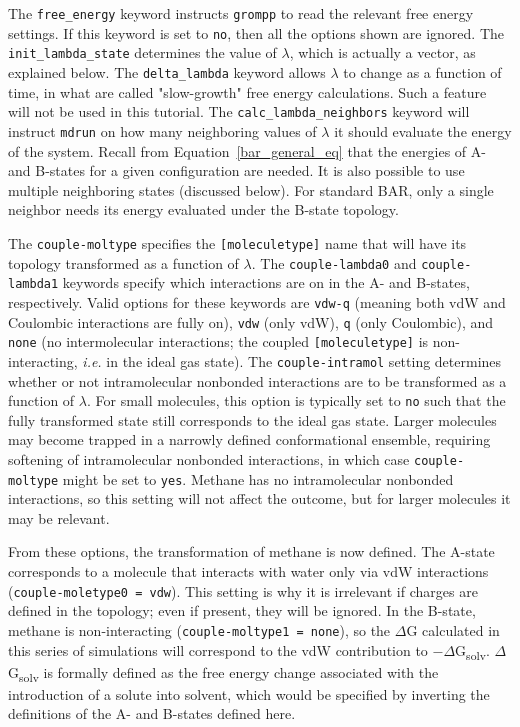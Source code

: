 \documentclass[9pt,tutorial]{livecoms}
\begin{document}
The \texttt{free\_energy} keyword instructs \texttt{grompp} to read the relevant free energy settings. If this keyword is set to \texttt{no}, then all the options shown are ignored. The \texttt{init\_lambda\_state} determines the value of $\lambda$, which is actually a vector, as explained below. The \texttt{delta\_lambda} keyword allows $\lambda$ to change as a function of time, in what are called "slow-growth" free energy calculations. Such a feature will not be used in this tutorial. The \texttt{calc\_lambda\_neighbors} keyword will instruct \texttt{mdrun} on how many neighboring values of $\lambda$ it should evaluate the energy of the system. Recall from Equation~\ref{bar_general_eq} that the energies of A- and B-states for a given configuration are needed. It is also possible to use multiple neighboring states (discussed below). For standard BAR, only a single neighbor needs its energy evaluated under the B-state topology.

The \texttt{couple-moltype} specifies the \texttt{[moleculetype]} name that will have its topology transformed as a function of $\lambda$. The \texttt{couple-lambda0} and \texttt{couple-lambda1} keywords specify which interactions are on in the A- and B-states, respectively. Valid options for these keywords are \texttt{vdw-q} (meaning both vdW and Coulombic interactions are fully on), \texttt{vdw} (only vdW), \texttt{q} (only Coulombic), and \texttt{none} (no intermolecular interactions; the coupled \texttt{[moleculetype]} is non-interacting, {\em i.e.} in the ideal gas state). The \texttt{couple-intramol} setting determines whether or not intramolecular nonbonded interactions are to be transformed as a function of $\lambda$. For small molecules, this option is typically set to \texttt{no} such that the fully transformed state still corresponds to the ideal gas state. Larger molecules may become trapped in a narrowly defined conformational ensemble, requiring softening of intramolecular nonbonded interactions, in which case \texttt{couple-moltype} might be set to \texttt{yes}. Methane has no intramolecular nonbonded interactions, so this setting will not affect the outcome, but for larger molecules it may be relevant.

From these options, the transformation of methane is now defined. The A-state corresponds to a molecule that interacts with water only via vdW interactions (\texttt{couple-moletype0 = vdw}). This setting is why it is irrelevant if charges are defined in the topology; even if present, they will be ignored. In the B-state, methane is non-interacting (\texttt{couple-moltype1 = none}), so the $\Delta$G calculated in this series of simulations will correspond to the vdW contribution to $-\Delta$G\textsubscript{solv}. $\Delta$G\textsubscript{solv} is formally defined as the free energy change associated with the introduction of a solute into solvent, which would be specified by inverting the definitions of the A- and B-states defined here.
\end{document}
